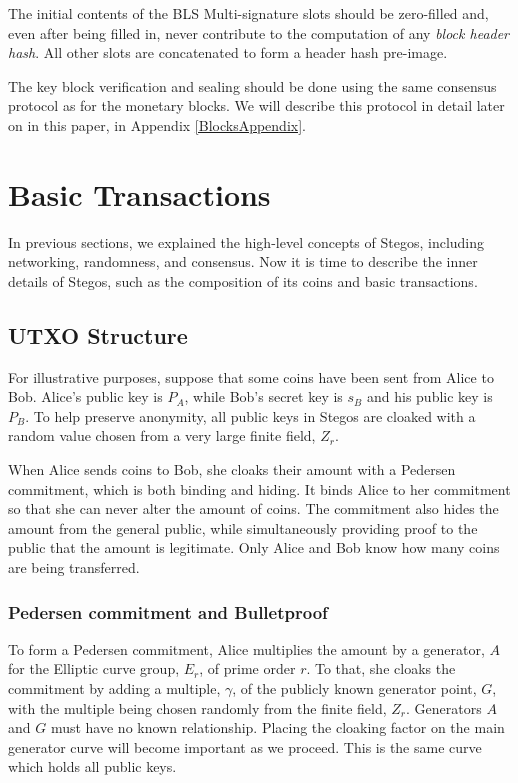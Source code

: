 \documentclass[8pt,fleqn,openany]{book}
\begin{document}
The initial contents of the BLS Multi-signature slots should be zero-filled and, even after being filled in, never contribute to the computation of any \textit{block header hash}. All other slots are concatenated to form a header hash pre-image.

The key block verification and sealing should be done using the same consensus protocol as for the monetary blocks. We will describe this protocol in detail later on in this paper, in Appendix \ref{BlocksAppendix}.

\section{Basic Transactions}

In previous sections, we explained the high-level concepts of Stegos, including networking, randomness, and consensus. Now it is time to describe the inner details of Stegos, such as the composition of its coins and basic transactions.

\subsection{UTXO Structure}

For illustrative purposes, suppose that some coins have been sent from Alice to Bob. Alice's public key is $P_A$, while Bob's secret key is $s_B$ and his public key is $P_B$. To help preserve anonymity, all public keys in Stegos are cloaked with a random value chosen from a very large finite field, $Z_r$.

When Alice sends coins to Bob, she cloaks their amount with a Pedersen commitment, which is both binding and hiding. It binds Alice to her commitment so that she can never alter the amount of coins. The commitment also hides the amount from the general public, while simultaneously providing proof to the public that the amount is legitimate. Only Alice and Bob know how many coins are being transferred. 

\subsubsection{Pedersen commitment and Bulletproof} To form a Pedersen commitment, Alice multiplies the amount by a generator, $A$ for the Elliptic curve group, $E_r$, of prime order $r$. To that, she cloaks the commitment by adding a multiple, $\gamma$, of the publicly known generator point, $G$, with the multiple being chosen randomly from the finite field, $Z_r$. Generators $A$ and $G$ must have no known relationship. Placing the cloaking factor on the main generator curve will become important as we proceed. This is the same curve which holds all public keys. 
\end{document}
